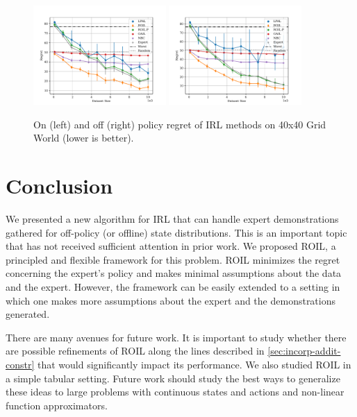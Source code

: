 \documentclass[10pt]{article}
\theoremstyle{plain}
\theoremstyle{remark}
\newcommand{\gersi}[1]{\textcolor{red}{[#1]}}
\begin{document}
\begin{figure}
	\centering
	\includegraphics[width=0.45\textwidth]{../src/plots/regrets/40x40_gridworld_on_policy_regret_regrets.pdf}
	\includegraphics[width=0.45\textwidth]{../src/plots/regrets/40x40_gridworld_off_policy_regret_regrets.pdf}
	\caption{On (left) and off (right) policy regret of IRL methods on 40x40 Grid World (lower is better).}
	\label{fig:grid-regret}
\end{figure}


\section{Conclusion}

We presented a new algorithm for IRL that can handle expert demonstrations gathered for off-policy (or offline) state distributions. This is an important topic that has not received sufficient attention in prior work. We proposed ROIL, a principled and flexible framework for this problem. ROIL minimizes the regret concerning the expert's policy and makes minimal assumptions about the data and the expert. However, the framework can be easily extended to a setting in which one makes more assumptions about the expert and the demonstrations generated.

There are many avenues for future work. It is important to study whether there are possible refinements of ROIL along the lines described in \cref{sec:incorp-addit-constr} that would significantly impact its performance. We also studied ROIL in a simple tabular setting. Future work should study the best ways to generalize these ideas to large problems with continuous states and actions and non-linear function approximators. 
\end{document}
